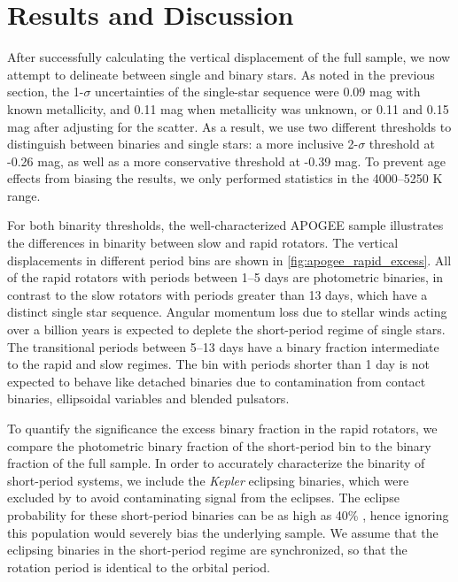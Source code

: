 \documentclass[manuscript]{aastex6}
\newcommand{\Kepler}{\mbox{\textit{Kepler}}}
\begin{document}
\section{Results and Discussion}
\label{sec:results}

After successfully calculating the vertical displacement of the full sample, we
now attempt to delineate between single and binary stars. As noted in the
previous section, the 1-\(\sigma\) uncertainties of the single-star sequence were 0.09 mag with 
known metallicity, and 0.11 mag when metallicity was unknown, or 0.11 and 0.15
mag after adjusting for the scatter. As a result, we use two
different thresholds to distinguish between binaries and single stars: a more
inclusive 2-\(\sigma\) threshold at -0.26 mag, as well as a more
conservative threshold at -0.39 mag. To prevent age effects from 
biasing the results, we only performed statistics in the 4000--5250 K 
range.

\begin{figure*}[htb]
    \centering
    \caption{\emph{Top Left to Bottom Right:} Vertical displacement of cool 
        APOGEE targets with \citet{McQuillan14} periods \(> 13\) days, between 
        \(5--13\) days, \(1--5\) days, and less than 1 day. Pink stars denote 
        eclipsing binaries with orbital periods within the same ranges. The 
        green and purple lines denote the inclusive and conservative 
        photometric binary thresholds, 
    respectively.}\label{fig:apogee_rapid_excess}
\end{figure*}

For both binarity thresholds, the well-characterized APOGEE sample 
illustrates the differences in binarity between slow and rapid rotators. The
vertical displacements in different period bins are shown in
\cref{fig:apogee_rapid_excess}. All of the rapid rotators with periods between
1--5 days are photometric binaries, in contrast to the slow rotators
with periods greater than 13 days, which have a distinct single star sequence. 
Angular momentum loss due to stellar winds acting over a billion years is
expected to deplete the short-period regime of single stars. The transitional 
periods between 5--13 days have a binary fraction intermediate to the 
rapid and slow regimes. The bin with periods shorter than 1 day is not expected
to behave like detached binaries due to contamination from contact binaries,
ellipsoidal variables and blended pulsators. 

To quantify the significance the excess binary fraction in the rapid rotators, 
we compare the photometric binary fraction of the short-period bin to the
binary fraction of the full sample. In order to accurately characterize the 
binarity of short-period systems, we include the \Kepler{} eclipsing binaries, 
which were excluded by \citet{McQuillan14} to avoid contaminating signal from the eclipses. The 
eclipse probability for these short-period binaries can be as high as 40\% 
\citep{Kirk16}, hence ignoring this population would severely
bias the underlying sample. We assume that the eclipsing binaries in the
short-period regime are synchronized, so that the rotation period is identical 
to the orbital period. 
\end{document}
